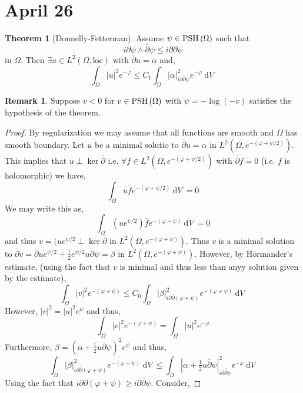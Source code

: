 \documentclass[12pt]{extarticle}
\renewcommand{\d}[1]{\: \mathrm{d}#1 \:}
\theoremstyle{definition}
\newtheorem{theorem}{Theorem}[section]
\newtheorem{remark}{Remark}
\begin{document}
\section{April 26}

\begin{theorem}[Donnelly-Fetterman]
Assume $\psi \in \mathrm{PSH}\left( \Omega \right)$ such that 
\[ i \partial \psi \wedge \bar{\partial} \psi \le i \partial \partial \psi \]
in $\Omega$. Then $\exists u \in L^2(\Omega, \text{loc})$ with $\bar{\partial} u = \alpha$ and,
\[ \int_\Omega |u|^2 e^{-\varphi} \le C_1 \int_\Omega |\alpha|^2_{i \partial \bar{\partial} \psi} e^{-\varphi} \d{V} \]
\end{theorem}

\begin{remark}
Suppose $v < 0$ for $v \in \mathrm{PSH}\left( \Omega \right)$ with $\psi = - \log{(-v)}$ satisfies the hypothesis of the theorem.
\end{remark}

\begin{proof}
By regularization we may assume that all functions are smooth and $\Omega$ has smooth boundary. Let $u$ be a minimal solutio to $\bar{\partial} u = \alpha$ in $L^2(\Omega, e^{-(\varphi + \psi / 2)})$. This implies that $u \perp \ker{\bar{\partial}}$ i.e. $\forall f \in L^2(\Omega, e^{-(\varphi + \psi / 2)})$ with $\bar{\partial} f = 0$ (i.e. $f$ is holomorphic) we have,
\[ \int_\Omega u \bar{f} e^{-(\varphi + \psi / 2)} \d{V} = 0 \]
We may write this as,
\[ \int_\Omega (u e^{\psi/2}) \bar{f} e^{-(\varphi + \psi)} \d{V} = 0 \]
and thus $v = (u e^{\psi / 2} \perp \ker{\bar{\partial}}$ in $L^2(\Omega, e^{-(\varphi + \psi)})$. Thus $v$ is a minimal solution to $\bar{\partial} v = \bar{\partial} u e^{\psi/2} + \tfrac{1}{2} e^{\psi / 2} u \bar{\partial} \psi = \beta$ in $L^2(\Omega, e^{-(\varphi + \psi)})$. However, by H\"{o}rmander's estimate, (using the fact that $v$ is minimal and thus less than anyy solution given by the estimate),
\[ \int_\Omega |v|^2 e^{-(\varphi + \psi)} \le C_0 \int_\Omega |\beta|^2_{i \partial \bar{\partial} (\varphi + \psi)} e^{-(\varphi + \psi)} \d{V} \]
However, $|v|^2 = |u|^2 e^{\psi}$ and thus,
\[ \int_\Omega |v|^2 e^{-(\varphi + \psi)} = \int_\Omega |u|^2 e^{- \varphi} \]
Furthermore, $\beta = (\alpha + \tfrac{1}{2} u \bar{\partial} \psi)^2 e^{\psi}$ and thus,
\[ \int_\Omega |\beta|^2_{i \partial \bar{\partial} (\varphi + \psi)} e^{-(\varphi + \psi)} \d{V} \le \int_\Omega |\alpha + \tfrac{1}{2} u \bar{\partial} \psi|^2_{i \partial \bar{\partial} \psi} e^{-\varphi} \d{V} \]
Using the fact that $i \partial \bar{\partial} (\varphi + \psi) \ge i \partial \bar{\partial} \psi$. 
Consider, 

\end{proof}
\end{document}
